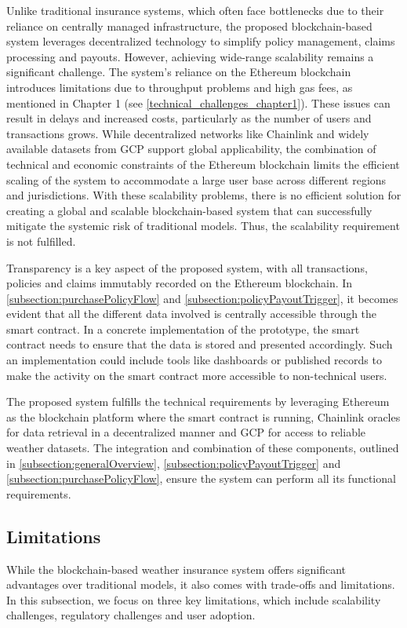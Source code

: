Unlike traditional insurance systems, which often face bottlenecks due to their reliance on centrally managed infrastructure, the proposed blockchain-based system leverages decentralized technology to simplify policy management, claims processing and payouts. However, achieving wide-range scalability remains a significant challenge. The system's reliance on the Ethereum blockchain introduces limitations due to throughput problems and high gas fees, as mentioned in Chapter 1 (see \cref{technical_challenges_chapter1}). These issues can result in delays and increased costs, particularly as the number of users and transactions grows. While decentralized networks like Chainlink and widely available datasets from GCP support global applicability, the combination of technical and economic constraints of the Ethereum blockchain limits the efficient scaling of the system to accommodate a large user base across different regions and jurisdictions. With these scalability problems, there is no efficient solution for creating a global and scalable blockchain-based system that can successfully mitigate the systemic risk of traditional models. Thus, the scalability requirement is not fulfilled.

Transparency is a key aspect of the proposed system, with all transactions, policies and claims immutably recorded on the Ethereum blockchain. In \cref{subsection:purchasePolicyFlow} and \cref{subsection:policyPayoutTrigger}, it becomes evident that all the different data involved is centrally accessible through the smart contract. In a concrete implementation of the prototype, the smart contract needs to ensure that the data is stored and presented accordingly. Such an implementation could include tools like dashboards or published records to make the activity on the smart contract more accessible to non-technical users.

The proposed system fulfills the technical requirements by leveraging Ethereum as the blockchain platform where the smart contract is running, Chainlink oracles for data retrieval in a decentralized manner and GCP for access to reliable weather datasets. The integration and combination of these components, outlined in \cref{subsection:generalOverview}, \cref{subsection:policyPayoutTrigger} and \cref{subsection:purchasePolicyFlow}, ensure the system can perform all its functional requirements.

\subsection{Limitations}\label{analysis_limitations}
While the blockchain-based weather insurance system offers significant advantages over traditional models, it also comes with trade-offs and limitations. In this subsection, we focus on three key limitations, which include scalability challenges, regulatory challenges and user adoption.

